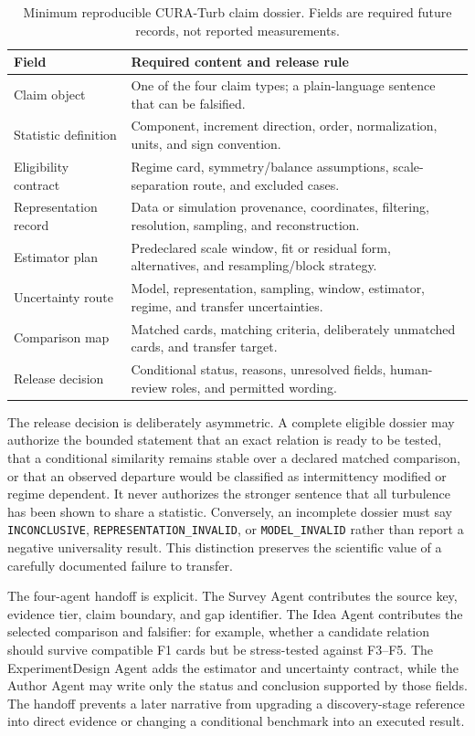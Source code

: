 \documentclass[conference]{../../../../Conference-LaTeX-template_10-17-19/IEEEtran}
\begin{document}
\begin{table}[!t]
\caption{Minimum reproducible CURA-Turb claim dossier. Fields are required future records, not reported measurements.}
\label{tab:schema}
\centering
\footnotesize
\begin{tabularx}{\columnwidth}{lY}
\toprule
Field & Required content and release rule \\
\midrule
Claim object & One of the four claim types; a plain-language sentence that can be falsified. \\
Statistic definition & Component, increment direction, order, normalization, units, and sign convention. \\
Eligibility contract & Regime card, symmetry/balance assumptions, scale-separation route, and excluded cases. \\
Representation record & Data or simulation provenance, coordinates, filtering, resolution, sampling, and reconstruction. \\
Estimator plan & Predeclared scale window, fit or residual form, alternatives, and resampling/block strategy. \\
Uncertainty route & Model, representation, sampling, window, estimator, regime, and transfer uncertainties. \\
Comparison map & Matched cards, matching criteria, deliberately unmatched cards, and transfer target. \\
Release decision & Conditional status, reasons, unresolved fields, human-review roles, and permitted wording. \\
\bottomrule
\end{tabularx}
\end{table}

The release decision is deliberately asymmetric. A complete eligible dossier may authorize the bounded statement that an exact relation is ready to be tested, that a conditional similarity remains stable over a declared matched comparison, or that an observed departure would be classified as intermittency modified or regime dependent. It never authorizes the stronger sentence that all turbulence has been shown to share a statistic. Conversely, an incomplete dossier must say \texttt{INCONCLUSIVE}, \texttt{REPRESENTATION\_INVALID}, or \texttt{MODEL\_INVALID} rather than report a negative universality result. This distinction preserves the scientific value of a carefully documented failure to transfer.

The four-agent handoff is explicit. The Survey Agent contributes the source key, evidence tier, claim boundary, and gap identifier. The Idea Agent contributes the selected comparison and falsifier: for example, whether a candidate relation should survive compatible F1 cards but be stress-tested against F3--F5. The ExperimentDesign Agent adds the estimator and uncertainty contract, while the Author Agent may write only the status and conclusion supported by those fields. The handoff prevents a later narrative from upgrading a discovery-stage reference into direct evidence or changing a conditional benchmark into an executed result.
\end{document}
